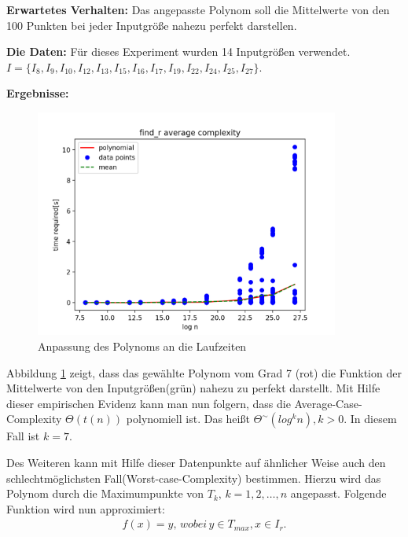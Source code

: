 \documentclass[12pt,oneside]{article}
\theoremstyle{remark}
\theoremstyle{definition}
\begin{document}
\textbf{\small{Erwartetes Verhalten:}}\newline
Das angepasste Polynom soll die Mittelwerte von den 100 Punkten bei jeder Inputgröße nahezu perfekt darstellen.

\textbf{\small{Die Daten:}}
Für dieses Experiment wurden 14 Inputgrößen verwendet.\newline 
$I = \{ I_{8},I_{9},I_{10},I_{12},I_{13},I_{15},I_{16},I_{17},I_{19},I_{22},I_{24},I_{25},I_{27} \}$.

\textbf{\small{Ergebnisse:}}
\begin{figure}[h]
\includegraphics[width=10cm]{plots/runtime_find_r.png}
\centering
\caption{Anpassung des Polynoms an die Laufzeiten}
\label{runtime-find_r}
\end{figure}

Abbildung \ref{runtime-find_r} zeigt, dass das gewählte Polynom vom Grad 7 (rot) die Funktion der Mittelwerte von den Inputgrößen(grün) nahezu zu perfekt darstellt. Mit Hilfe dieser empirischen Evidenz kann man nun folgern, dass die Average-Case-Complexity $\Theta(t(n))$ polynomiell ist. Das heißt $\Theta^{\sim}(log^k  n), k > 0$. In diesem Fall ist $k = 7$.


Des Weiteren kann mit Hilfe dieser Datenpunkte auf ähnlicher Weise auch den schlechtmöglichsten Fall(Worst-case-Complexity) bestimmen. Hierzu wird das Polynom durch die Maximumpunkte von $T_{k}, \, k = 1,2, \dots, n$ angepasst.
Folgende Funktion wird nun approximiert: 
\begin{align*}
    f(x) = y, \, wobei \,y \in T_{max} , x \in I_{r}.
\end{align*}
\end{document}
